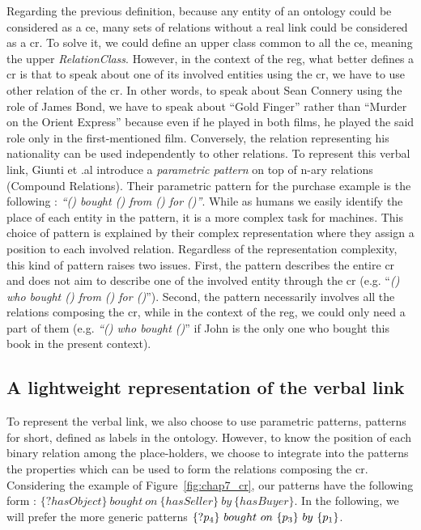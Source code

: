 Regarding the previous definition, because any entity of an ontology could be considered as a \acrshort{ce}, many sets of relations without a real link could be considered as a \acrshort{cr}. To solve it, we could define an upper class common to all the \acrshort{ce}, meaning the upper \textit{RelationClass}. However, in the context of the \acrshort{reg}, what better defines a \acrshort{cr} is that to speak about one of its involved entities using the \acrshort{cr}, we have to use other relation of the \acrshort{cr}. In other words, to speak about Sean Connery using the role of James Bond, we have to speak about ``Gold Finger'' rather than ``Murder on the Orient Express'' because even if he played in both films, he played the said role only in the first-mentioned film. Conversely, the relation representing his nationality can be used independently to other relations. To represent this verbal link, Giunti et .al \cite{giunti_2019_representing} introduce a \textit{parametric pattern} on top of n-ary relations (Compound Relations). Their parametric pattern for the purchase example is the following : \textit{``() bought () from () for ()''}. While as humans we easily identify the place of each entity in the pattern, it is a more complex task for machines. This choice of pattern is explained by their complex representation where they assign a position to each involved relation. Regardless of the representation complexity, this kind of pattern raises two issues. First, the pattern describes the entire \acrshort{cr} and does not aim to describe one of the involved entity through the \acrshort{cr} (e.g. ``\textit{() who bought () from () for ()}''). Second, the pattern necessarily involves all the relations composing the \acrshort{cr}, while in the context of the \acrshort{reg}, we could only need a part of them (e.g. \textit{``() who bought ()}'' if John is the only one who bought this book in the present context).

\subsection{A lightweight representation of the verbal link}

To represent the verbal link, we also choose to use parametric patterns, patterns for short, defined as labels in the ontology. However, to know the position of each binary relation among the place-holders, we choose to integrate into the patterns the properties which can be used to form the relations composing the \acrshort{cr}. Considering the example of Figure~\ref{fig:chap7_cr}, our patterns have the following form : $\{?hasObject\}\ bought\ on\ \{hasSeller\}\ by\ \{hasBuyer\}$. In the following, we will prefer the more generic patterns $\{?\property_4\}\ bought\ on\ \{\property_3\}\ by\ \{\property_1\}$.

